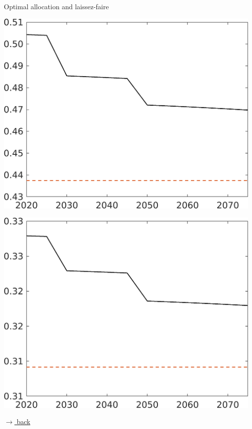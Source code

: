 \documentclass[11pt,aspectratio=169]{beamer}
\begin{document}
\begin{frame}{Optimal allocation and laissez-faire}
\begin{minipage}[]{0.32\textwidth}
	\end{minipage}
	\begin{minipage}[]{0.32\textwidth}
		\includegraphics[width=1\textwidth]{../codding_model/own_basedOnFried/optimalPol_elastS_DisuSci/figures/all_1705/hh_BAUCompOPT_T_NoTaus_spillover0_noskill0_sep1_BN0_ineq0_red0_xgrowth0_etaa0.79_lgd0.png}
	\end{minipage}	
	\begin{minipage}[]{0.32\textwidth}
		\includegraphics[width=1\textwidth]{../codding_model/own_basedOnFried/optimalPol_elastS_DisuSci/figures/all_1705/hl_BAUCompOPT_T_NoTaus_spillover0_noskill0_sep1_BN0_ineq0_red0_xgrowth0_etaa0.79_lgd0.png}
	\end{minipage}
	
	\vspace{-2mm}
	\hfill
	\hyperlink{backmainres}{\tiny{$\rightarrow$ back}} 
\end{frame}
\end{document}
